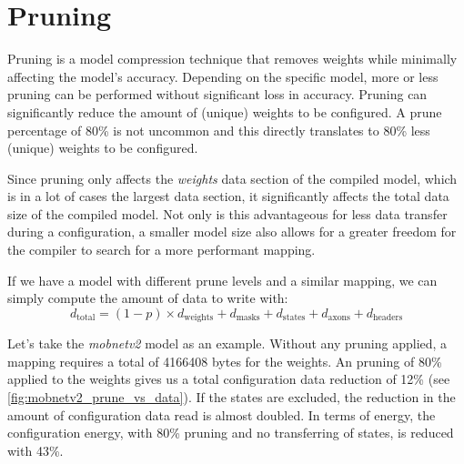 \section{Pruning}
Pruning is a model compression technique that removes weights while minimally affecting the model's accuracy.
Depending on the specific model, more or less pruning can be performed without significant loss in accuracy.
Pruning can significantly reduce the amount of (unique) weights to be configured.
A prune percentage of 80\% is not uncommon and this directly translates to 80\% less (unique) weights to be configured.

Since pruning only affects the \textit{weights} data section of the compiled model, which is in a lot of cases the largest data section, it significantly affects the total data size of the compiled model.
Not only is this advantageous for less data transfer during a configuration, a smaller model size also allows for a greater freedom for the compiler to search for a more performant mapping.

If we have a model with different prune levels and a similar mapping, we can simply compute the amount of data to write with:
\begin{equation}
    d_\textrm{total} = (1-p) \times d_\textrm{weights} + d_\textrm{masks} + d_\textrm{states} + d_\textrm{axons} + d_\textrm{headers}
\end{equation}

Let's take the \textit{mobnetv2} model as an example.
Without any pruning applied, a mapping requires a total of \num{4166408} bytes for the weights.
An pruning of 80\% applied to the weights gives us a total configuration data reduction of 12\% (see \cref{fig:mobnetv2_prune_vs_data}).
If the states are excluded, the reduction in the amount of configuration data read is almost doubled.
In terms of energy, the configuration energy, with 80\% pruning and no transferring of states, is reduced with 43\%.  

